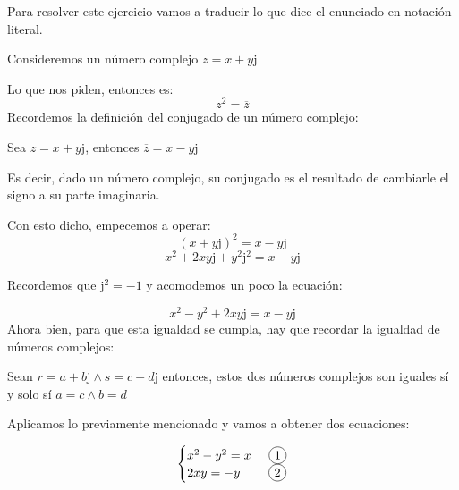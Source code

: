 \documentclass[11pt]{article}
\def\imj{\mathrm{j}}
\newcommand*\circled[1]{\tikz[baseline=(char.base)]{
		\node[shape=circle,draw,inner sep=2pt] (char) {#1};}}
\begin{document}
		Para resolver este ejercicio vamos a traducir lo que dice el enunciado en notación literal.
		
		Consideremos un número complejo $z=x+y\imj$
		
		Lo que nos piden, entonces es:
		$$z^{2}=\overline{z}$$
		Recordemos la definición del conjugado de un número complejo:
		\begin{center}
			Sea $z=x+y\imj$, entonces $\overline{z}=x-y\imj$
		\end{center}
		
		Es decir, dado un número complejo, su conjugado es el resultado de cambiarle el signo a su parte imaginaria.
		
		Con esto dicho, empecemos a operar:
		$$\left(x+y\imj\right)^{2}=x-y\imj$$
		$$x^{2}+2xy\imj+y^{2}\imj^{2}=x-y\imj$$
		\begin{center}
			Recordemos que $\imj^{2}=-1$ y acomodemos un poco la ecuación:
		\end{center}
		$$x^{2}-y^{2}+2xy\imj=x-y\imj$$
		Ahora bien, para que esta igualdad se cumpla, hay que recordar la igualdad de números complejos:
		\begin{center}
			Sean $r=a+b\imj \wedge s=c+d\imj$ entonces, estos dos números complejos son iguales sí y solo sí $a=c \wedge b=d$ 
		\end{center}
		\begin{center}
			Aplicamos lo previamente mencionado y vamos a obtener dos ecuaciones:
		\end{center}
		$$\left\{\begin{matrix}
		x^2-y^2=x \hspace{0.5cm} \circled{1} \\ 2xy=-y \hspace{0.8cm} \circled{2}
		\end{matrix}\right.$$
\end{document}
